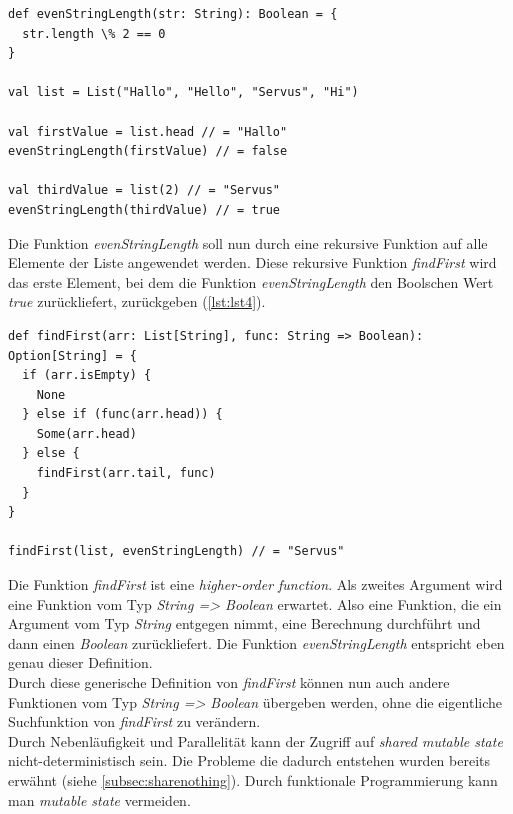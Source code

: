 \begin{lstlisting}[caption={Funktion, welche prüft, ob die Länge eines Strings gerade ist.},label={lst:lst3}]
def evenStringLength(str: String): Boolean = {
  str.length \% 2 == 0
}

val list = List("Hallo", "Hello", "Servus", "Hi")

val firstValue = list.head // = "Hallo"
evenStringLength(firstValue) // = false

val thirdValue = list(2) // = "Servus"
evenStringLength(thirdValue) // = true
\end{lstlisting}

\pagebreak

Die Funktion \textit{evenStringLength} soll nun durch eine rekursive Funktion auf alle Elemente der Liste angewendet werden. Diese rekursive Funktion \textit{findFirst} wird das erste Element, bei dem die Funktion \textit{evenStringLength} den Boolschen Wert \textit{true} zurückliefert, zurückgeben (\ref{lst:lst4}).
  
\begin{lstlisting}[caption={Rekursive Funktion zur Suche des ersten passenden Elements.},label={lst:lst4}]
def findFirst(arr: List[String], func: String => Boolean): Option[String] = {
  if (arr.isEmpty) {
    None
  } else if (func(arr.head)) {
    Some(arr.head)
  } else {
    findFirst(arr.tail, func)
  }
}

findFirst(list, evenStringLength) // = "Servus"
\end{lstlisting}

Die Funktion \textit{findFirst} ist eine \textit{higher-order function}. Als zweites Argument wird eine Funktion vom Typ \textit{String => Boolean} erwartet. Also eine Funktion, die ein Argument vom Typ \textit{String} entgegen nimmt, eine Berechnung durchführt und dann einen \textit{Boolean} zurückliefert. Die Funktion \textit{evenStringLength} entspricht eben genau dieser Definition.\\
Durch diese generische Definition von \textit{findFirst} können nun auch andere Funktionen vom Typ \textit{String => Boolean} übergeben werden, ohne die eigentliche Suchfunktion von \textit{findFirst} zu verändern.\\

Durch Nebenläufigkeit und Parallelität kann der Zugriff auf \textit{shared mutable state} nicht-deterministisch sein. Die Probleme die dadurch entstehen wurden bereits erwähnt (siehe \ref{subsec:sharenothing}). Durch funktionale Programmierung kann man \textit{mutable state} vermeiden.

